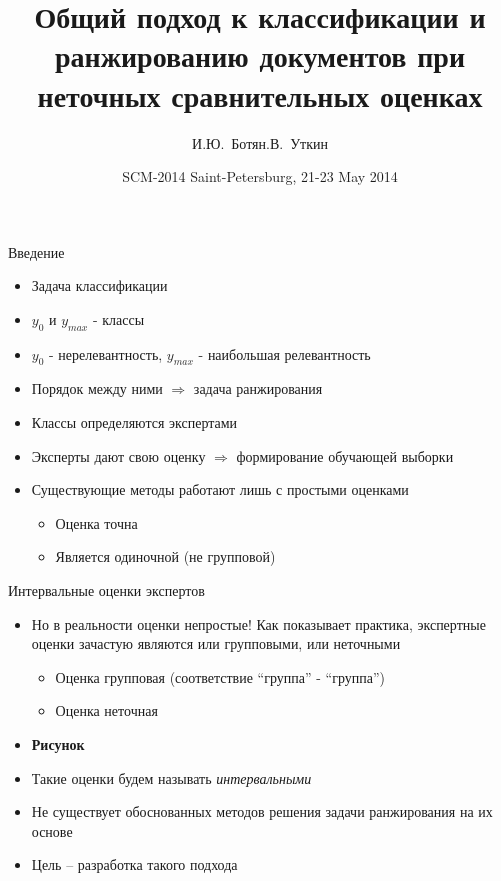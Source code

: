 \documentclass[11pt]{beamer}
\title[]{Общий подход к классификации и ранжированию документов при неточных сравнительных оценках}
\author[И.Ю.~Ботян, Л.В.~Уткин]{И.Ю.~Ботян\andЛ.В.~Уткин}
\institute[СПбГЛТУ]{\large Санкт-Петербургский государственный лесотехнический университет}
\date[SCM 2014]{\large SCM-2014 Saint-Petersburg, 21-23 May 2014}
\begin{document}
\begin{frame}

\titlepage

\end{frame}
\begin{frame}{Введение}

\begin{itemize}
	\item Задача классификации
	\item \(y_{0}\) и \(y_{max}\) - классы
	\item \(y_{0}\) - нерелевантность, \(y_{max}\) - наибольшая релевантность
	\item Порядок между ними \(\Rightarrow\) задача ранжирования
	\item Классы определяются экспертами
	\item Эксперты дают свою оценку \(\Rightarrow\) формирование обучающей выборки
	\item Существующие методы работают лишь с простыми оценками
	\begin{itemize}
		\item Оценка точна
		\item Является одиночной (не групповой)
	\end{itemize}
\end{itemize}

\end{frame}
\begin{frame}{Интервальные оценки экспертов}

\begin{itemize}
	\item Но в реальности оценки непростые! Как показывает практика, экспертные оценки зачастую являются или групповыми, или неточными
	\begin{itemize}
		\item Оценка групповая (соответствие ``группа'' - ``группа'')
		\item Оценка неточная
	\end{itemize}
	\item \textbf{Рисунок}
	\item Такие оценки будем называть \emph{интервальными}
	\item Не существует обоснованных методов решения задачи ранжирования на их основе
	\item Цель – разработка такого подхода
\end{itemize}

\end{frame}
\end{document}
